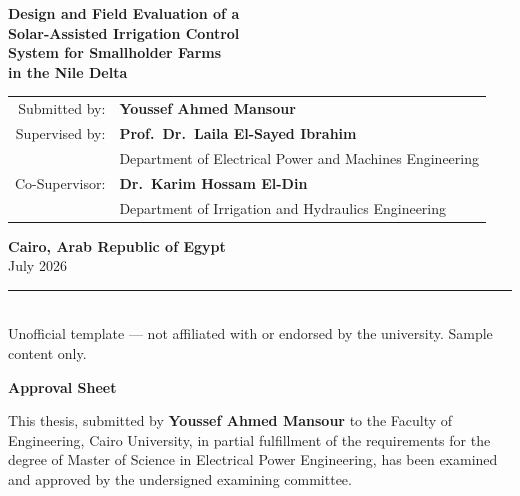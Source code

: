 \documentclass[12pt,a4paper,oneside]{report}
\begin{document}
\begin{titlepage}
\begin{center}
{\Huge\bfseries\color{cairoblue} Design and Field Evaluation of a\\[2pt] Solar-Assisted Irrigation Control\\[2pt] System for Smallholder Farms\\[2pt] in the Nile Delta}

\vspace{0.15in}
{\large\itshape\color{softgray}}

\vspace{0.5in}

\begin{tabular}{rl}
{\color{softgray}\small Submitted by:} & {\bfseries Youssef Ahmed Mansour}\\[10pt]
{\color{softgray}\small Supervised by:} & {\bfseries Prof.\ Dr.\ Laila El-Sayed Ibrahim}\\
 & {\small Department of Electrical Power and Machines Engineering}\\[6pt]
{\color{softgray}\small Co-Supervisor:} & {\bfseries Dr.\ Karim Hossam El-Din}\\
 & {\small Department of Irrigation and Hydraulics Engineering}
\end{tabular}

\vspace{0.5in}

{\color{cairoblue}\bfseries Cairo, Arab Republic of Egypt}\\
{\color{cairoblue} July 2026}

\vfill

\noindent\rule{\textwidth}{0.3pt}\\[3pt]
{\scriptsize\color{softgray} Unofficial template --- not affiliated with or endorsed by the university. Sample content only.}

\end{center}
\restoregeometry
\end{titlepage}

\newpage
\thispagestyle{plain}
\begin{center}
{\Large\bfseries\color{cairoblue} Approval Sheet}
\end{center}
\vspace{0.3in}

This thesis, submitted by \textbf{Youssef Ahmed Mansour} to the Faculty of Engineering, Cairo
University, in partial fulfillment of the requirements for the degree of Master of Science in
Electrical Power Engineering, has been examined and approved by the undersigned examining
committee.
\end{document}
